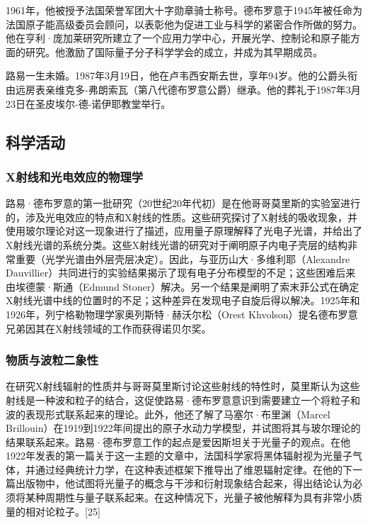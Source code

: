 1961年，他被授予法国荣誉军团大十字勋章骑士称号。德布罗意于1945年被任命为法国原子能高级委员会顾问，以表彰他为促进工业与科学的紧密合作所做的努力。他在亨利·庞加莱研究所建立了一个应用力学中心，开展光学、控制论和原子能方面的研究。他激励了国际量子分子科学学会的成立，并成为其早期成员。

路易一生未婚。1987年3月19日，他在卢韦西安斯去世，享年94岁。他的公爵头衔由远房表亲维克多-弗朗索瓦（第八代德布罗意公爵）继承。他的葬礼于1987年3月23日在圣皮埃尔-德-诺伊耶教堂举行。
\subsection{科学活动}
\subsubsection{X射线和光电效应的物理学}
路易·德布罗意的第一批研究（20世纪20年代初）是在他哥哥莫里斯的实验室进行的，涉及光电效应的特点和X射线的性质。这些研究探讨了X射线的吸收现象，并使用玻尔理论对这一现象进行了描述，应用量子原理解释了光电子光谱，并给出了X射线光谱的系统分类。这些X射线光谱的研究对于阐明原子内电子壳层的结构非常重要（光学光谱由外层壳层决定）。因此，与亚历山大·多维利耶（Alexandre Dauvillier）共同进行的实验结果揭示了现有电子分布模型的不足；这些困难后来由埃德蒙·斯通（Edmund Stoner）解决。另一个结果是阐明了索末菲公式在确定X射线光谱中线的位置时的不足；这种差异在发现电子自旋后得以解决。1925年和1926年，列宁格勒物理学家奥列斯特·赫沃尔松（Orest Khvolson）提名德布罗意兄弟因其在X射线领域的工作而获得诺贝尔奖。
\subsubsection{物质与波粒二象性}  
在研究X射线辐射的性质并与哥哥莫里斯讨论这些射线的特性时，莫里斯认为这些射线是一种波和粒子的结合，这促使路易·德布罗意意识到需要建立一个将粒子和波的表现形式联系起来的理论。此外，他还了解了马塞尔·布里渊（Marcel Brillouin）在1919到1922年间提出的原子水动力学模型，并试图将其与玻尔理论的结果联系起来。路易·德布罗意工作的起点是爱因斯坦关于光量子的观点。在他1922年发表的第一篇关于这一主题的文章中，法国科学家将黑体辐射视为光量子气体，并通过经典统计力学，在这种表述框架下推导出了维恩辐射定律。在他的下一篇出版物中，他试图将光量子的概念与干涉和衍射现象结合起来，得出结论认为必须将某种周期性与量子联系起来。在这种情况下，光量子被他解释为具有非常小质量的相对论粒子。[25]


